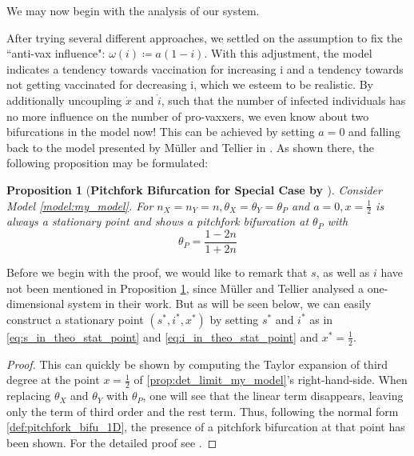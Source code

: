 \documentclass[12pt,a4paper,twoside]{article}
\newtheorem{prop}{Proposition}[section]
\begin{document}
We may now begin with the analysis of our system.\newline

After trying several different approaches, we settled on the assumption to fix the ``anti-vax influence": $\omega\left(i\right) \coloneqq a\left(1-i\right)$. With this adjustment, the model indicates a tendency towards vaccination for increasing i and a tendency towards not getting vaccinated for decreasing i, which we esteem to be realistic. By additionally uncoupling $\dot{x}$ and $\dot{i}$, such that the number of infected individuals has no more influence on the number of pro-vaxxers, we even know about two bifurcations in the model now! This can be achieved by setting $a = 0$ and falling back to the model presented by M\"uller and Tellier in \cite{JohannesMuller2020}. As shown there, the following proposition may be formulated:

\begin{prop}[\textbf{Pitchfork Bifurcation for Special Case by \cite{JohannesMuller2020}}]\label{prop:mueller_stat_point}
	Consider Model \ref{model:my_model}. For $n_X = n_Y = n, \theta_X = \theta_Y = \theta_P$ and $a = 0, x = \frac{1}{2}$ is always a stationary point and shows a pitchfork bifurcation at $\theta_P$ with
	\begin{equation*}
		\theta_P = \frac{1-2n}{1+2n}
	\end{equation*}
\end{prop}

Before we begin with the proof, we would like to remark that $s$, as well as $i$ have not been mentioned in Proposition \ref{prop:mueller_stat_point}, since M\"uller and Tellier analysed a one-dimensional system in their work. But as will be seen below, we can easily construct a stationary point $(s^*,i^*,x^*)$ by setting $s^*$ and $i^*$ as in \eqref{eq:s_in_theo_stat_point} and \eqref{eq:i_in_theo_stat_point} and $x^* = \frac{1}{2}$.

\begin{proof}
	This can quickly be shown by computing the Taylor expansion of third degree at the point $x = \frac{1}{2}$ of \eqref{prop:det_limit_my_model}'s right-hand-side. When replacing $\theta_X$ and $\theta_Y$ with $\theta_P$, one will see that the linear term disappears, leaving only the term of third order and the rest term. Thus, following the normal form \eqref{def:pitchfork_bifu_1D}, the presence of a pitchfork bifurcation at that point has been shown. For the detailed proof see \cite{JohannesMuller2020}.
\end{proof}
\end{document}
